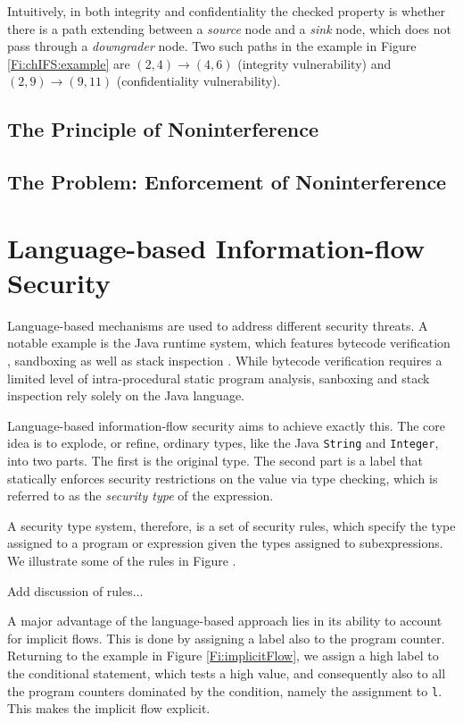 Intuitively, in both integrity and confidentiality the checked property is whether there is a path extending between a \emph{source} node and a \emph{sink} node, which does not pass through a \emph{downgrader} node. Two such paths in the example in Figure \ref{Fi:chIFS:example} are $(2,4) \longrightarrow (4,6)$ (integrity vulnerability) and  
$(2,9) \longrightarrow (9,11)$ (confidentiality vulnerability). 

\subsection{The Principle of Noninterference}



\subsection{The Problem: Enforcement of Noninterference}



\section{Language-based Information-flow Security}

Language-based mechanisms are used to address different security threats. A notable example is the Java runtime system, which features bytecode verification \cite{XXX}, sandboxing \cite{XXX} as well as stack inspection \cite{XXX}. While bytecode verification requires a limited level of intra-procedural static program analysis, sanboxing and stack inspection rely solely on the Java language.

Language-based information-flow security aims to achieve exactly this. The core idea is to explode, or refine, ordinary types, like the Java {\tt String} and {\tt Integer}, into two parts. The first is the original type. The second part is a label that statically enforces security restrictions on the value via type checking, which is referred to as the \emph{security type} of the expression.

A security type system, therefore, is a set of security rules, which specify the type assigned to a program or expression given the types assigned to subexpressions. We illustrate some of the rules in Figure \cite{SabelfeldJournalPaper}.

 Add discussion of rules...

A major advantage of the language-based approach lies in its ability to account for implicit flows. This is done by assigning a label also to the program counter. Returning to the example in Figure \ref{Fi:implicitFlow}, we assign a high label to the conditional statement, which tests a high value, and consequently also to all the program counters dominated by the condition, namely the assignment to {\tt l}. This makes the implicit flow explicit. 

